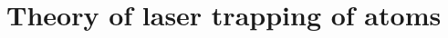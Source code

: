 
\chapter{\label{chap:dipole}Theory of laser trapping of atoms}


\ifpdf{}
    \graphicspath{{Chapter1/Figs/Raster/}{Chapter1/Figs/PDF/}{Chapter1/Figs/}}
\else
    \graphicspath{{Chapter1/Figs/Vector/}{Chapter1/Figs/}}
\fi

